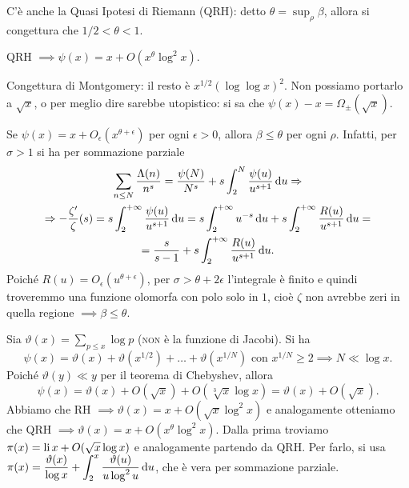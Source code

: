 C'è anche la Quasi Ipotesi di Riemann (QRH): detto $\displaystyle \theta=\sup_{\rho} \beta$, allora si congettura che $1/2<\theta<1$.

\begin{exc}
  QRH $\implies \psi(x)=x+O(x^{\theta}\log^2{x})$.
\end{exc}

Congettura di Montgomery: il resto è $x^{1/2}(\log\log{x})^2$. Non possiamo portarlo a $\sqrt{x}$, o per meglio dire sarebbe utopistico: si sa che $\psi(x)-x=\Omega_{\pm}(\sqrt{x})$.

\begin{oss}
  Se $\psi(x)=x+O_{\epsilon}(x^{\theta+\epsilon})$ per ogni $\epsilon>0$, allora $\beta \le \theta$ per ogni $\rho$. Infatti, per $\sigma>1$ si ha per sommazione parziale
  \begin{gather*}
    \sum_{n \le N} \frac{\Lambda(n)}{n^s}=\frac{\psi(N)}{N^s}+s\int_2^N \frac{\psi(u)}{u^{s+1}}\mathop{}\!\mathrm{d} u \Rightarrow \\
    \Rightarrow -\frac{\zeta'}{\zeta}(s)=s\int_2^{+\infty} \frac{\psi(u)}{u^{s+1}}\mathop{}\!\mathrm{d} u=s\int_2^{+\infty} u^{-s}\mathop{}\!\mathrm{d} u+s\int_2^{+\infty} \frac{R(u)}{u^{s+1}}\mathop{}\!\mathrm{d} u= \\
    =\frac{s}{s-1}+s\int_2^{+\infty} \frac{R(u)}{u^{s+1}}\mathop{}\!\mathrm{d} u.
  \end{gather*}
  Poiché $R(u)=O_{\epsilon}(u^{\theta+\epsilon})$, per $\sigma > \theta+2\epsilon$ l'integrale è finito e quindi troveremmo una funzione olomorfa con polo solo in $1$, cioè $\zeta$ non avrebbe zeri in quella regione $\implies \beta \le \theta$.
\end{oss}

Sia $\displaystyle \vartheta(x)=\sum_{p \le x} \log{p}$ (\textsc{non} è la funzione di Jacobi). Si ha
$$\psi(x)=\vartheta(x)+\vartheta(x^{1/2})+\dots+\vartheta(x^{1/N})\text{ con }x^{1/N} \ge 2 \implies N \ll \log{x}.$$
Poiché $\vartheta(y) \ll y$ per il teorema di Chebyshev, allora
$$\psi(x)=\vartheta(x)+O(\sqrt{x})+O(\sqrt[3]{x}\log{x})=\vartheta(x)+O(\sqrt{x}).$$
Abbiamo che RH $\implies \vartheta(x)=x+O(\sqrt{x}\log^2{x})$ e analogamente otteniamo che QRH $\implies \vartheta(x)=x+O(x^{\theta}\log^2{x})$. Dalla prima troviamo $\pi(x)=\operatorname{li}{x}+O(\sqrt{x}\log{x})$ e analogamente partendo da QRH.
Per farlo, si usa $\displaystyle \pi(x)=\frac{\vartheta(x)}{\log{x}}+\int_2^x\frac{\vartheta(u)}{u\log^2{u}}\mathop{}\!\mathrm{d} u$, che è vera per sommazione parziale.
